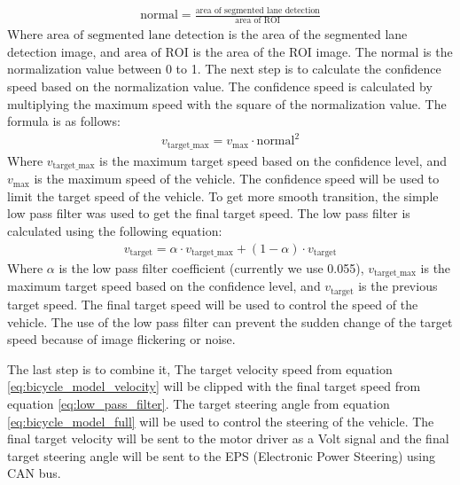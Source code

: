 \documentclass[conference]{IEEEtran}
\begin{document}
\begin{equation}
	\begin{aligned}
	\text{normal} = \frac{\text{area of segmented lane detection}}{\text{area of ROI}}
	\label{eq:confidence_level}
	\end{aligned}
\end{equation}
Where $\text{area of segmented lane detection}$ is the area of the segmented lane detection image, and $\text{area of ROI}$ is the area of the ROI image. The $\text{normal}$ is the normalization value between 0 to 1.
The next step is to calculate the confidence speed based on the normalization value. The confidence speed is calculated by multiplying the maximum speed with the square of the normalization value. The formula is as follows:
\begin{equation}
	\begin{aligned}
		v_{\text{target\_max}} = v_{\text{max}} \cdot \text{normal}^2
	\label{eq:confidence_speed}
	\end{aligned}
\end{equation}
Where $v_{\text{target\_max}}$ is the maximum target speed based on the confidence level, and $v_{\text{max}}$ is the maximum speed of the vehicle. The confidence speed will be used to limit the target speed of the vehicle. To get more smooth transition, the simple low pass filter was used to get the final target speed. The low pass filter is calculated using the following equation:
\begin{equation}
	\begin{aligned}
		v_{\text{target}} = \alpha \cdot v_{\text{target\_max}} + (1 - \alpha) \cdot v_{\text{target}}
	\label{eq:low_pass_filter}
	\end{aligned}
\end{equation}
Where $\alpha$ is the low pass filter coefficient (currently we use 0.055), $v_{\text{target\_max}}$ is the maximum target speed based on the confidence level, and $v_{\text{target}}$ is the previous target speed. The final target speed will be used to control the speed of the vehicle. The use of the low pass filter can prevent the sudden change of the target speed because of image flickering or noise. 

\par    
The last step is to combine it, The target velocity speed from equation \ref{eq:bicycle_model_velocity} will be clipped with the final target speed from equation \ref{eq:low_pass_filter}. The target steering angle from equation \ref{eq:bicycle_model_full} will be used to control the steering of the vehicle. The final target velocity will be sent to the motor driver as a Volt signal and the final target steering angle will be sent to the EPS (Electronic Power Steering) using CAN bus.
\end{document}
